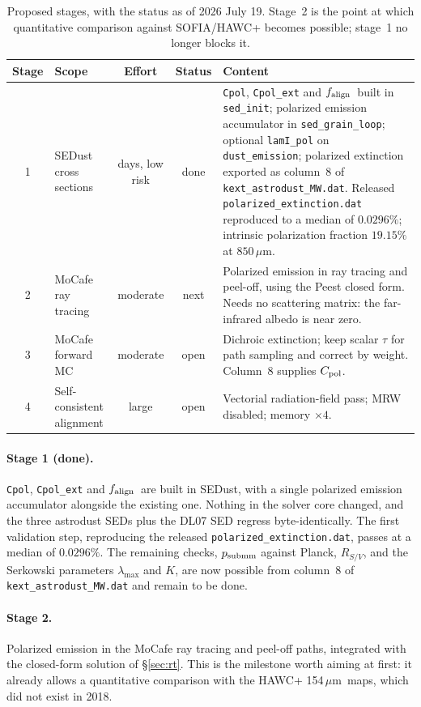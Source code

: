 \documentclass{my_memo}
\newcommand{\code}[1]{\texttt{#1}}
\newcommand{\um}{\ensuremath{\,\mu\mathrm{m}}}
\newcommand{\Cpol}{\ensuremath{C_{\rm pol}}}
\newcommand{\falign}{\ensuremath{f_{\rm align}}}
\begin{document}
\begin{table}[!ht]
\centering
\caption{Proposed stages, with the status as of 2026 July 19. Stage~2 is
the point at which quantitative comparison against SOFIA/HAWC+ becomes
possible; stage~1 no longer blocks it.}
\label{tab:stages}
\begin{tabularx}{\textwidth}{c l c c X}
\toprule
Stage & Scope & Effort & Status & Content \\
\midrule
1 & SEDust cross sections & days, low risk & done &
  \code{Cpol}, \code{Cpol\_ext} and \falign\ built in \code{sed\_init};
  polarized emission accumulator in \code{sed\_grain\_loop}; optional
  \code{lamI\_pol} on \code{dust\_emission}; polarized extinction
  exported as column~8 of \code{kext\_astrodust\_MW.dat}. Released
  \code{polarized\_extinction.dat} reproduced to a median of
  $0.0296\%$; intrinsic polarization fraction $19.15\%$ at $850\um$. \\
2 & MoCafe ray tracing & moderate & next &
  Polarized emission in ray tracing and peel-off, using the Peest
  closed form. Needs no scattering matrix: the far-infrared albedo is
  near zero. \\
3 & MoCafe forward MC & moderate & open &
  Dichroic extinction; keep scalar $\tau$ for path sampling and correct
  by weight. Column~8 supplies \Cpol. \\
4 & Self-consistent alignment & large & open &
  Vectorial radiation-field pass; MRW disabled; memory $\times 4$. \\
\bottomrule
\end{tabularx}
\end{table}

\paragraph{Stage 1 (done).} \code{Cpol}, \code{Cpol\_ext} and \falign\
are built in SEDust, with a single polarized emission accumulator
alongside the existing one. Nothing in the solver core changed, and the
three astrodust SEDs plus the DL07 SED regress byte-identically. The
first validation step, reproducing the released
\code{polarized\_extinction.dat}, passes at a median of $0.0296\%$. The
remaining checks, $p_{\rm submm}$ against Planck, $R_{S/V}$, and the
Serkowski parameters $\lambda_{\max}$ and $K$, are now possible from
column~8 of \code{kext\_astrodust\_MW.dat} and remain to be done.

\paragraph{Stage 2.} Polarized emission in the MoCafe ray tracing and
peel-off paths, integrated with the closed-form solution of
\S\ref{sec:rt}. This is the milestone worth aiming at first: it already
allows a quantitative comparison with the HAWC+ 154\um\ maps, which did
not exist in 2018.
\end{document}
